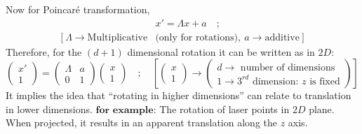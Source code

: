 \documentclass[14pt]{article} %
\begin{document}
\noindent Now for Poincaré transformation,
\begin{align*} 
&x' = \Lambda x + a \quad;\\
[~\Lambda \rightarrow \text{Multiplicative} &\text{(only for rotations)},~a \rightarrow \text{additive}~]
\end{align*}
Therefore, for the $(d + 1)$ dimensional rotation it can be written as in $2D$:
\[
\begin{pmatrix}
x' \\
1
\end{pmatrix}
=
\begin{pmatrix}
\Lambda & a \\
0 & 1
\end{pmatrix}
\begin{pmatrix}
x \\
1
\end{pmatrix}
\quad;\quad\left[
\begin{pmatrix}
x \\
1
\end{pmatrix}
\to
\begin{pmatrix}
d \rightarrow \text{ number of dimensions} \\
1 \rightarrow 3^{rd} \text{ dimension: } z \text{ is fixed} 
\end{pmatrix}
\right]
\]
It implies the idea that ``rotating in higher dimensions'' can relate to translation in lower dimensions. $\textbf{for example:}$  The rotation of laser points in $2D$ plane. When projected, it results in an apparent translation along the $z$ axis. \\
\end{document}
